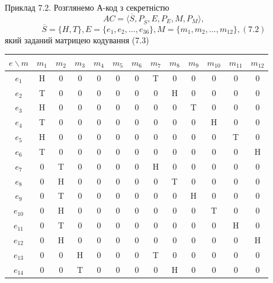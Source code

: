 \begin{example}
    Приклад 7.2. Розглянемо А-код з секретністю
    \begin{equation*}
        AC = \langle \overline{S}, P_{\overline{S}}, E, P_E, M, P_M \rangle,
    \end{equation*}
    \begin{equation}
        \overline{S} = \{H, T\}, E = \{e_1, e_2, ..., e_{36}\}, M = \{m_1, m_2, ..., m_{12}\}, (7.2)
    \end{equation}
    який заданий матрицею кодування (7.3)
    
    \begin{center}
        \begin{tabular}{|c|c|c|c|c|c|c|c|c|c|c|c|c|}
            \hline
            $e \backslash m$ & $m_1$ & $m_2$ & $m_3$ & $m_4$ & $m_5$ & $m_6$ & $m_7$ & $m_8$ & $m_9$ & $m_{10}$ & $m_{11}$ & $m_{12}$ \\\hline
            $e_{1}$ & H & 0 & 0 & 0 & 0 & 0 & T & 0 & 0 & 0 & 0 & 0 \\\hline
            $e_{2}$ & T & 0 & 0 & 0 & 0 & 0 & 0 & H & 0 & 0 & 0 & 0 \\\hline
            $e_{3}$ & H & 0 & 0 & 0 & 0 & 0 & 0 & 0 & T & 0 & 0 & 0 \\\hline
            $e_{4}$ & T & 0 & 0 & 0 & 0 & 0 & 0 & 0 & 0 & H & 0 & 0 \\\hline
            $e_{5}$ & H & 0 & 0 & 0 & 0 & 0 & 0 & 0 & 0 & 0 & T & 0 \\\hline
            $e_{6}$ & T & 0 & 0 & 0 & 0 & 0 & 0 & 0 & 0 & 0 & 0 & H \\\hline
            $e_{7}$ & 0 & T & 0 & 0 & 0 & 0 & H & 0 & 0 & 0 & 0 & 0 \\\hline
            $e_{8}$ & 0 & H & 0 & 0 & 0 & 0 & 0 & T & 0 & 0 & 0 & 0 \\\hline
            $e_{9}$ & 0 & T & 0 & 0 & 0 & 0 & 0 & 0 & H & 0 & 0 & 0 \\\hline
            $e_{10}$ & 0 & H & 0 & 0 & 0 & 0 & 0 & 0 & 0 & T & 0 & 0 \\\hline
            $e_{11}$ & 0 & T & 0 & 0 & 0 & 0 & 0 & 0 & 0 & 0 & H & 0 \\\hline
            $e_{12}$ & 0 & H & 0 & 0 & 0 & 0 & 0 & 0 & 0 & 0 & 0 & H \\\hline
            $e_{13}$ & 0 & 0 & H & 0 & 0 & 0 & T & 0 & 0 & 0 & 0 & 0 \\\hline
            $e_{14}$ & 0 & 0 & T & 0 & 0 & 0 & 0 & H & 0 & 0 & 0 & 0 \\\hline

\end{tabular}
\end{center}
\end{example}
